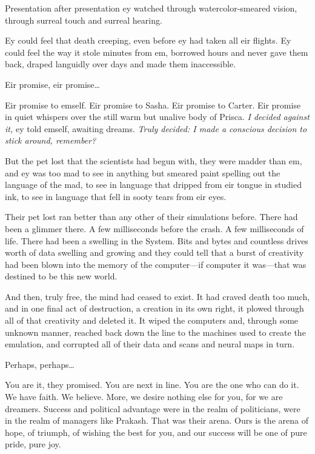 Presentation after presentation ey watched through watercolor-smeared vision, through surreal touch and surreal hearing.

Ey could feel that death creeping, even before ey had taken all eir flights. Ey could feel the way it stole minutes from em, borrowed hours and never gave them back, draped languidly over days and made them inaccessible.

Eir promise, eir promise\ldots{}

Eir promise to emself. Eir promise to Sasha. Eir promise to Carter. Eir promise in quiet whispers over the still warm but unalive body of Prisca. \emph{I decided against it,} ey told emself, awaiting dreams. \emph{Truly decided: I made a conscious decision to stick around, remember?}

But the pet lost that the scientists had begun with, they were madder than em, and ey was too mad to see in anything but smeared paint spelling out the language of the mad, to see in language that dripped from eir tongue in studied ink, to see in language that fell in sooty tears from eir eyes.

Their pet lost ran better than any other of their simulations before. There had been a glimmer there. A few milliseconds before the crash. A few milliseconds of life. There had been a swelling in the System. Bits and bytes and countless drives worth of data swelling and growing and they could tell that a burst of creativity had been blown into the memory of the computer—if computer it was—that was destined to be this new world.

And then, truly free, the mind had ceased to exist. It had craved death too much, and in one final act of destruction, a creation in its own right, it plowed through all of that creativity and deleted it. It wiped the computers and, through some unknown manner, reached back down the line to the machines used to create the emulation, and corrupted all of their data and scans and neural maps in turn.

Perhaps, perhaps\ldots

You are it, they promised. You are next in line. You are the one who can do it. We have faith. We believe. More, we desire nothing else for you, for we are dreamers. Success and political advantage were in the realm of politicians, were in the realm of managers like Prakash. That was their arena. Ours is the arena of hope, of triumph, of wishing the best for you, and our success will be one of pure pride, pure joy.

